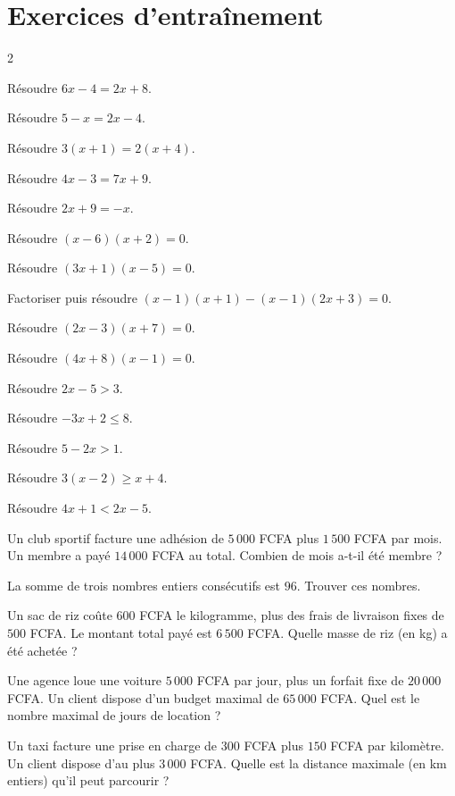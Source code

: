 \section{Exercices d'entraînement}
\begin{multicols}{2}

\exo{} Résoudre $6x-4=2x+8$.

\exo{} Résoudre $5-x=2x-4$.

\exo{} Résoudre $3(x+1)=2(x+4)$.

\exo{} Résoudre $4x-3=7x+9$.

\exo{} Résoudre $2x+9=-x$.

\exo{} Résoudre $(x-6)(x+2)=0$.

\exo{} Résoudre $(3x+1)(x-5)=0$.

\exo{} Factoriser puis résoudre $(x-1)(x+1)-(x-1)(2x+3)=0$.

\exo{} Résoudre $(2x-3)(x+7)=0$.

\exo{} Résoudre $(4x+8)(x-1)=0$.

\exo{} Résoudre $2x-5>3$.

\exo{} Résoudre $-3x+2\le8$.

\exo{} Résoudre $5-2x>1$.

\exo{} Résoudre $3(x-2)\ge x+4$.

\exo{} Résoudre $4x+1<2x-5$.

\exo{} Un club sportif facture une adhésion de $5\,000$ FCFA plus $1\,500$ FCFA par
mois. Un membre a payé $14\,000$ FCFA au total. Combien de mois a-t-il été membre ?

\exo{} La somme de trois nombres entiers consécutifs est $96$. Trouver ces nombres.

\exo{} Un sac de riz coûte $600$ FCFA le kilogramme, plus des frais de livraison
fixes de $500$ FCFA. Le montant total payé est $6\,500$ FCFA. Quelle masse de riz (en kg) a
été achetée ?

\exo{} Une agence loue une voiture $5\,000$ FCFA par jour, plus un forfait fixe de
$20\,000$ FCFA. Un client dispose d'un budget maximal de $65\,000$ FCFA. Quel est le nombre
maximal de jours de location ?

\exo{} Un taxi facture une prise en charge de $300$ FCFA plus $150$ FCFA par
kilomètre. Un client dispose d'au plus $3\,000$ FCFA. Quelle est la distance maximale (en
km entiers) qu'il peut parcourir ?


\end{multicols}
